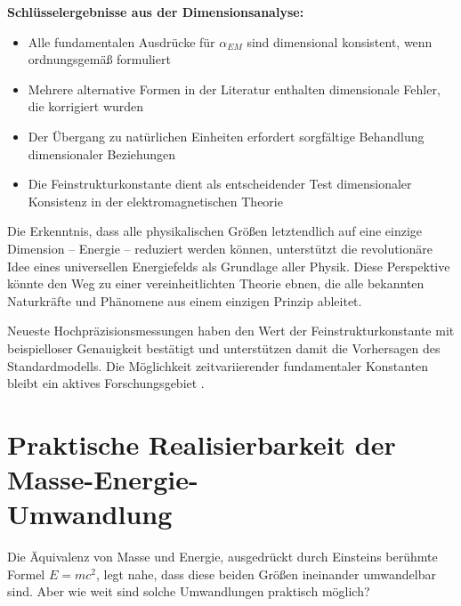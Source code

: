 \documentclass[12pt,a4paper]{article}
\begin{document}
	\textbf{Schlüsselergebnisse aus der Dimensionsanalyse:}
	\begin{itemize}
		\item Alle fundamentalen Ausdrücke für $\alpha_{EM}$ sind dimensional konsistent, wenn ordnungsgemäß formuliert
		\item Mehrere alternative Formen in der Literatur enthalten dimensionale Fehler, die korrigiert wurden
		\item Der Übergang zu natürlichen Einheiten erfordert sorgfältige Behandlung dimensionaler Beziehungen
		\item Die Feinstrukturkonstante dient als entscheidender Test dimensionaler Konsistenz in der elektromagnetischen Theorie
	\end{itemize}
	
	Die Erkenntnis, dass alle physikalischen Größen letztendlich auf eine einzige Dimension – Energie – reduziert werden können, unterstützt die revolutionäre Idee eines universellen Energiefelds als Grundlage aller Physik. Diese Perspektive könnte den Weg zu einer vereinheitlichten Theorie ebnen, die alle bekannten Naturkräfte und Phänomene aus einem einzigen Prinzip ableitet.
	
	Neueste Hochpräzisionsmessungen \cite{Parker2018} haben den Wert der Feinstrukturkonstante mit beispielloser Genauigkeit bestätigt und unterstützen damit die Vorhersagen des Standardmodells. Die Möglichkeit zeitvariierender fundamentaler Konstanten bleibt ein aktives Forschungsgebiet \cite{Uzan2003}.
	
	\section{Praktische Realisierbarkeit der Masse-Energie-\\Umwandlung}
	
	Die Äquivalenz von Masse und Energie, ausgedrückt durch Einsteins berühmte Formel $E = mc^2$, legt nahe, dass diese beiden Größen ineinander umwandelbar sind. Aber wie weit sind solche Umwandlungen praktisch möglich?
	
\end{document}
